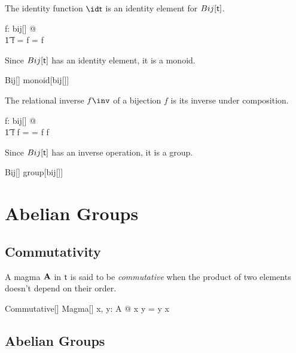 \documentclass{amsart}
\begin{document}
\begin{remark}
The identity function $\id \genT$ is an identity element for $Bij[\mathsf{t}]$.

\begin{zed}
	\forall f: bij[\setT] @ \\
	\t1	 \id \setT \circ f = f = f \circ \id \setT
\end{zed}

Since $Bij[\mathsf{t}]$ has an identity element, it is a monoid.

\begin{zed}
	Bij[\setT] \in monoid[bij[\setT]]
\end{zed}

\end{remark}

\begin{remark}
The relational inverse $f \inv$ of a bijection $f$ is its inverse under composition.

\begin{zed}
	\forall f: bij[\setT] @ \\
	\t1	f \circ f \inv = \id \setT = f \inv \circ f
\end{zed}

Since $Bij[\mathsf{t}]$ has an inverse operation, it is a group.

\begin{zed}
	Bij[\setT] \in group[bij[\setT]]
\end{zed}

\end{remark}

\section{Abelian Groups}

\subsection{Commutativity}

A magma $\mathbf{A}$ in $\mathsf{t}$ is said to be {\em commutative} when the product of two elements doesn't depend on 
their order.
\begin{schema}{Commutative}[\genT]
	Magma[\genT]
\where
	\forall x, y: A @ x \opG y = y \opG x
\end{schema}

\subsection{Abelian Groups}
\end{document}
